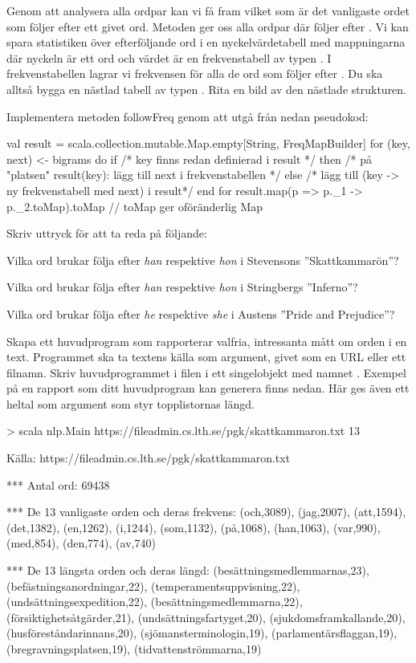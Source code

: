 Genom att analysera alla ordpar kan vi få fram vilket som är det vanligaste ordet som följer efter ett givet ord. Metoden  ger oss alla ordpar  där  följer efter . Vi kan spara statistiken över efterföljande ord i en nyckelvärdetabell med mappningarna  där nyckeln  är ett ord  och värdet  är en frekvenstabell av typen . I frekvenstabellen lagrar vi frekvensen för alla de ord som följer efter . Du ska alltså bygga en nästlad tabell av typen . Rita en bild av den nästlade strukturen.\Pen

Implementera metoden followFreq genom att utgå från nedan pseudokod:
\begin{Code}
val result = scala.collection.mutable.Map.empty[String, FreqMapBuilder]
for (key, next) <- bigrams do
  if /* key finns redan definierad i result */ then
    /* på "platsen" result(key): lägg till next i frekvenstabellen */
  else
    /* lägg till (key -> ny frekvenstabell med next) i result*/
end for
result.map(p => p._1 -> p._2.toMap).toMap // toMap ger oföränderlig Map
\end{Code}
Skriv uttryck för att ta reda på följande:\Pen

\Subtask Vilka ord brukar följa efter \emph{han} respektive \emph{hon} i Stevensons ''Skattkammarön''?

\Subtask Vilka ord brukar följa efter \emph{han} respektive \emph{hon} i Stringbergs ''Inferno''?

\Subtask Vilka ord brukar följa efter \emph{he} respektive \emph{she} i Austens ''Pride and Prejudice''?


\Task Skapa ett huvudprogram som rapporterar valfria, intressanta mått om orden i en text. Programmet ska ta textens källa som argument, givet som en URL eller ett filnamn. Skriv huvudprogrammet i filen  i ett singelobjekt med namnet . Exempel på en rapport som ditt huvudprogram kan generera finns nedan. Här ges även ett heltal som argument som styr topplistornas längd.
\begin{REPL}
> scala nlp.Main https://fileadmin.cs.lth.se/pgk/skattkammaron.txt 13

Källa: https://fileadmin.cs.lth.se/pgk/skattkammaron.txt

*** Antal ord: 69438

*** De 13 vanligaste orden och deras frekvens:
(och,3089), (jag,2007), (att,1594), (det,1382), (en,1262),
(i,1244), (som,1132), (på,1068), (han,1063), (var,990),
(med,854), (den,774), (av,740)

*** De 13 längsta orden och deras längd:
(besättningsmedlemmarnas,23), (befästningsanordningar,22),
(temperamentsuppvisning,22), (undsättningsexpedition,22),
(besättningsmedlemmarna,22), (försiktighetsåtgärder,21),
(undsättningsfartyget,20), (sjukdomsframkallande,20),
(husföreståndarinnans,20), (sjömansterminologin,19),
(parlamentärsflaggan,19), (bregravningsplatsen,19),
(tidvattenströmmarna,19)
\end{REPL}

